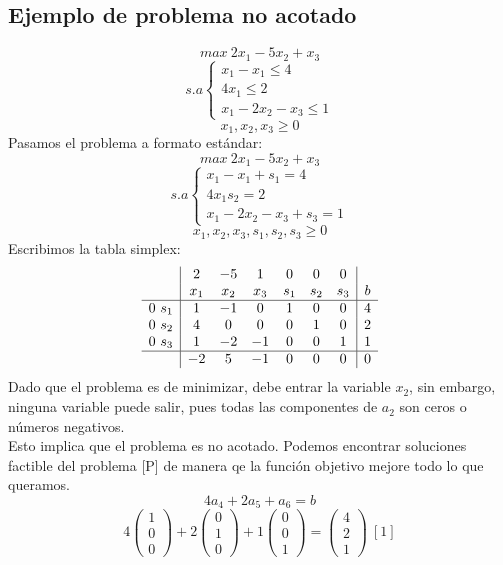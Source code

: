\documentclass[11pt,fleqn]{book} %
\begin{document}
\subsection{Ejemplo de problema no acotado}
$$ max ~2x_1 - 5x_2 + x_3$$
$$
s.a \left\{ 
\begin{array}{c}
  x_1-x_1 \leq 4 \\
  4x_1 \leq 2 \\
  x_1 - 2x_2 - x_3 \leq 1
\end{array}
\right.$$
$$x_1, x_2, x_3 \geq 0$$ \newpage
Pasamos el problema a formato estándar:
$$ max ~2x_1 - 5x_2 + x_3$$
$$
s.a \left\{ 
\begin{array}{c}
  x_1-x_1+s_1 = 4 \\
  4x_1 s_2 = 2 \\
  x_1 - 2x_2 - x_3 + s_3 = 1
\end{array}
\right.$$
$$x_1, x_2, x_3, s_1, s_2, s_3 \geq 0$$
Escribimos la tabla simplex:
$$
\begin{array}{c|cccccc|c}
  & 2 & -5 & 1 & 0 & 0 & 0 & \\
  & x_1 & x_2 & x_3 & s_1 & s_2 & s_3 & b \\ \hline
  0 ~s_1 & 1 & -1 & 0 & 1 & 0 & 0 & 4 \\
  0 ~ s_2 & 4 & 0 & 0 & 0 & 1 & 0 & 2 \\
  0 ~s_3 & 1 & -2 & -1 & 0 & 0 & 1 & 1 \\ \hline
  & -2 & 5 & -1 & 0 & 0 & 0 & 0
\end{array}
$$
Dado que el problema es de minimizar, debe entrar la variable $x_2$, sin embargo, ninguna variable puede salir, pues todas las componentes de $a_2$ son ceros o números negativos. \\
Esto implica que el problema es no acotado. Podemos encontrar soluciones factible del problema [P] de manera qe la función objetivo mejore todo lo que queramos.
$$ 4 a_4+2a_5+a_6=b$$
$$4 \left(\begin{array}{c}
  1 \\ 0 \\ 0
\end{array}\right)+2\left(\begin{array}{c}
  0 \\ 1 \\ 0
\end{array}\right)+1\left(\begin{array}{c}
  0 \\ 0 \\ 1
\end{array}\right)=\left(\begin{array}{c}
  4 \\ 2 \\ 1
\end{array}\right) ~ [1]$$
\end{document}
